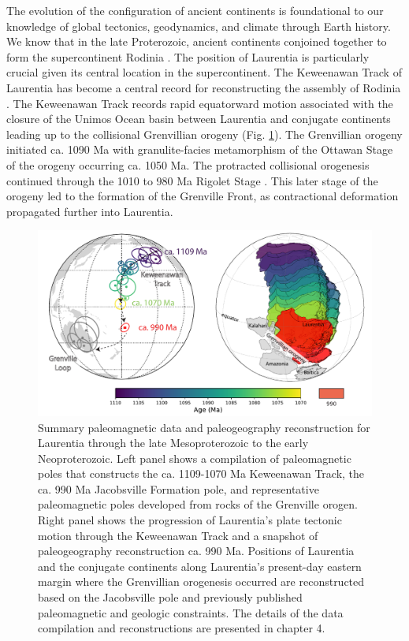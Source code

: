 The evolution of the configuration of ancient continents is foundational to our knowledge of global tectonics, geodynamics, and climate through Earth history. We know that in the late Proterozoic, ancient continents conjoined together to form the supercontinent Rodinia \citep[e.g.][]{Li2008a, Swanson-Hysell2021c, Evans2021b}. The position of Laurentia is particularly crucial given its central location in the supercontinent. The Keweenawan Track of Laurentia has become a central record for reconstructing the assembly of Rodinia \citep{Evans2021b}. The Keweenawan Track records rapid equatorward motion associated with the closure of the Unimos Ocean basin between Laurentia and conjugate continents leading up to the collisional Grenvillian orogeny (Fig. \ref{fig:abstract_paleogeography}). The Grenvillian orogeny initiated ca. 1090 Ma with granulite-facies metamorphism of the Ottawan Stage of the orogeny occurring ca. 1050 Ma. The protracted collisional orogenesis continued through the 1010 to 980 Ma Rigolet Stage \citep{Rivers2008a, Rivers2012b, Swanson-Hysell2023a}. This later stage of the orogeny led to the formation of the Grenville Front, as contractional deformation propagated further into Laurentia. 

\begin{figure}[h!]
    \centering
    \includegraphics[width=\textwidth]{figure/pole_summary.pdf}
    \caption[Summary paleomagnetic poles and associated paleogeography reconstruction for Laurentia and some of its conjugate continents through the late Mesoproterozoic to the early Neoproterozoic.]{Summary paleomagnetic data and paleogeography reconstruction for Laurentia through the late Mesoproterozoic to the early Neoproterozoic. Left panel shows a compilation of paleomagnetic poles that constructs the ca. 1109-1070 Ma Keweenawan Track, the ca. 990 Ma Jacobsville Formation pole, and representative paleomagnetic poles developed from rocks of the Grenville orogen. Right panel shows the progression of Laurentia's plate tectonic motion through the Keweenawan Track and a snapshot of paleogeography reconstruction ca. 990 Ma. Positions of Laurentia and the conjugate continents along Laurentia's present-day eastern margin where the Grenvillian orogenesis occurred are reconstructed based on the Jacobsville pole and previously published paleomagnetic and geologic constraints. The details of the data compilation and reconstructions are presented in chapter 4.}
    \label{fig:abstract_paleogeography}
\end{figure}


